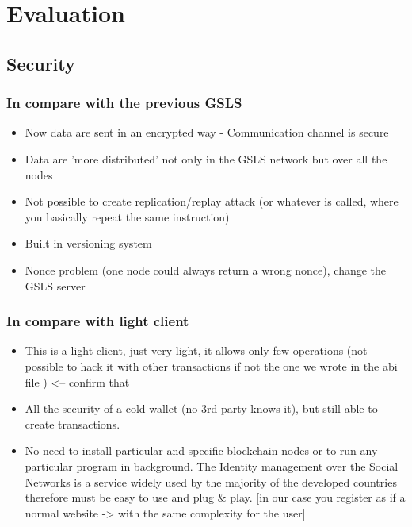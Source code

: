 \section{Evaluation}
\label{S:4}


\subsection{Security}

\subsubsection{In compare with the previous GSLS}

\begin{itemize}
  \item Now data are sent in an encrypted way - Communication channel is secure
  \item Data are 'more distributed' not only in the GSLS network but over all the nodes
  \item Not possible to create replication/replay attack (or whatever is called, where you basically repeat the same instruction)
  \item Built in versioning system
  \item Nonce problem (one node could always return a wrong nonce), change the GSLS server
\end{itemize}

\subsubsection{In compare with light client}
\begin{itemize}
  \item This is a light client, just very light, it allows only few operations (not possible to hack it with other transactions if not the one we wrote in the abi file ) <-- confirm that
  \item All the security of a cold wallet (no 3rd party knows it), but still able to create transactions.
  \item No need to install particular and specific blockchain nodes or to run any particular program in background. The Identity management over the Social Networks is a service widely used by the majority of the developed countries therefore must be easy to use and plug & play. [in our case you register as if a normal website -> with the same complexity for the user]
\end{itemize}